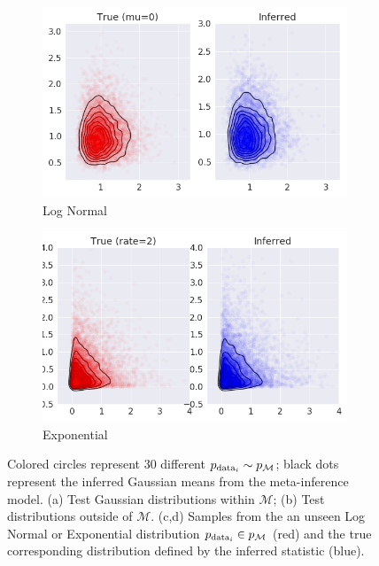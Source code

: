 \begin{figure}
\begin{subfigure}[b]{0.49\linewidth}
    \caption{}
\end{subfigure}
\begin{subfigure}[b]{0.49\linewidth}
    \includegraphics[width=\linewidth]{images/chapter5/toy_gaussian/lognormal_exapmle_good.png}
    \caption{Log Normal}
\end{subfigure}
\begin{subfigure}[b]{0.49\linewidth}
    \includegraphics[width=\linewidth]{images/chapter5/toy_gaussian/exponential_exapmle_good.png}
    \caption{Exponential}
\end{subfigure}
\caption{Colored circles represent 30 different $p_{\textup{data}_i} \sim p_{\mathcal{M}}$; black dots represent the inferred Gaussian means from the meta-inference model. (a) Test Gaussian distributions within $\mathcal{M}$; (b) Test distributions outside of $\mathcal{M}$. (c,d) Samples from the an unseen Log Normal or Exponential distribution $p_{\textup{data}_i} \in p_{\mathcal{M}}$ (red) and the true corresponding distribution defined by the inferred statistic (blue).}
\label{fig:gaussian_plot}
\end{figure}

